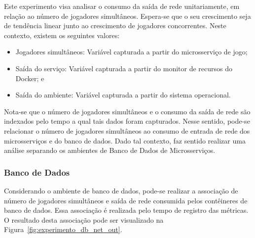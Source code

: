 Este experimento visa analisar o consumo da saída de rede unitariamente, em relação ao número de jogadores simultâneos.
%
Espera-se que o seu crescimento seja de tendência linear junto ao crescimento de jogadores concorrentes.
%
Neste contexto, existem os seguintes valores:

\begin{itemize}
    \item Jogadores simultâneos: Variável capturada a partir do microsserviço de jogo;
    \item Saída do serviço: Variável capturada a partir do monitor de recursos do Docker; e
    \item Saída do ambiente: Variável capturada a partir do sistema operacional.
\end{itemize}

Nota-se que o número de jogadores simultâneos e o consumo da saída de rede são indexados pelo tempo a qual tais dados foram capturados.
%
Nesse sentido, pode-se relacionar o número de jogadores simultâneos ao consumo de entrada de rede dos microsserviços e do banco de dados.
%
Dado tal contexto, faz sentido realizar uma análise separando os ambientes de Banco de Dados de Microsserviços.

\subsubsection{Banco de Dados}

Considerando o ambiente de banco de dados, pode-se realizar a associação de número de jogadores simultâneos e saída de rede consumida pelos contêineres de banco de dados.
%
Essa associação é realizada pelo tempo de registro das métricas.
%
O resultado desta associação pode ser visualizado na Figura~\ref{fig:experimento_db_net_out}.

